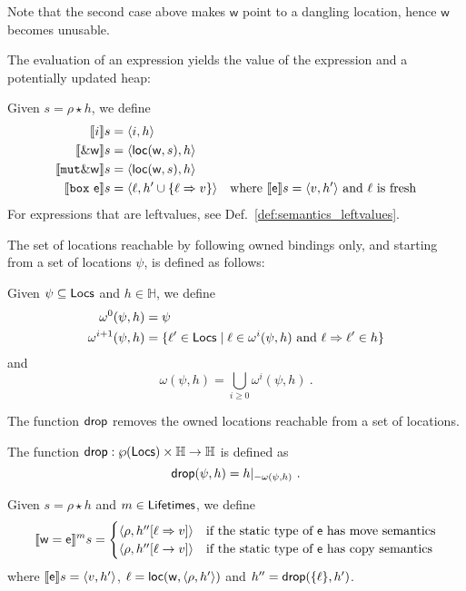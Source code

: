 \noindent
Note that the second case above makes $\mathsf{w}$ point to a dangling location, hence
$\mathsf{w}$ becomes unusable.

The evaluation of an expression yields the value of the expression and a potentially updated heap:

\begin{definition}\label{def:semantics_expressions}
  Given $s=\rho\star h$, we define
  \begin{align*}
    \den[i]{s}&=\langle i,h\rangle\\
    \den[\borrow\mathsf{w}]{s}&=\langle\loc(\mathsf{w},s),h\rangle\\
    \den[\mathtt{mut}\borrow\mathsf{w}]{s}&=\langle\loc(\mathsf{w},s),h\rangle\\
    \den[\mathtt{box}\ \mathsf{e}]{s}&=\langle\ell,h'\cup\{\ell\Rightarrow v\}\rangle
    & \text{where $\den[\mathsf{e}]{s}=\langle v, h'\rangle$ and $\ell$ is fresh}
  \end{align*}
  For expressions that are leftvalues, see Def.~\ref{def:semantics_leftvalues}.
\end{definition}

The set of locations reachable by following owned bindings only, and starting from a set of locations $\psi$,
is defined as follows:
%
\begin{definition}
  Given $\psi\subseteq\Locs$ and $h\in\mathbb{H}$, we define
  \begin{align*}
  \omega^0(\psi,h)&=\psi\\ %
  \omega^{i+1}(\psi,h)&=\{\ell'\in\Locs\mid\ell\in\omega^i(\psi,h)\text{ and }\ell\Rightarrow\ell'\in h\}
  \end{align*}
  and
  \[
  \omega(\psi,h)=\bigcup\limits_{i\ge 0}\omega^i(\psi,h)~.
  \]
\end{definition}

The function $\drop$ removes the owned locations reachable from a set of locations.
%
\begin{definition}[Drop]\label{def:drop}
  The function $\drop:\wp(\Locs)\times\mathbb{H}\to\mathbb{H}$ is defined as
  \[
  \drop(\psi,h)=h|_{-{\omega(\psi,h)}}~.
  \]
\end{definition}

\begin{definition}\label{def:semantics_assigmment}
  Given $s=\rho\star h$ and $m\in\Lifetimes$, we define
  \[
  \denl[\mathsf{w}=\mathsf{e}]{m}{s}=\begin{cases}
  \langle\rho,h''[\ell\Rightarrow v]\rangle & \text{if the static type of $\mathsf{e}$ has move semantics}\\
  \langle\rho,h''[\ell\to v]\rangle & \text{if the static type of $\mathsf{e}$ has copy semantics}
  \end{cases}
  \]
  where $\den[\mathsf{e}]{s}=\langle v,h'\rangle$, $\ell=\loc(\mathsf{w},\langle\rho,h'\rangle)$ and
  $h''=\drop(\{\ell\},h')$.
\end{definition}

